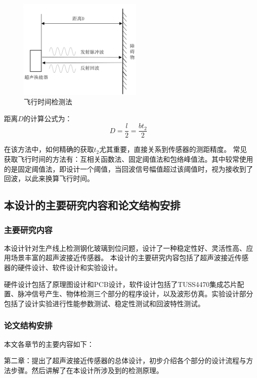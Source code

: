    \begin{figure}[!h]
    	\centering
    	\includegraphics[width=6cm]{figure/飞行时间检测法.png}
    	\caption{飞行时间检测法}
    	\label{飞行时间检测法}
    \end{figure}\par
    距离$D$的计算公式为：
    \begin{equation}
    	D=\frac{l}{2}=\frac{bt_2}{2}
    \end{equation}\par
	在该方法中，如何精确的获取$t_2$尤其重要，直接关系到传感器的测距精度。
	常见获取飞行时间的方法有：互相关函数法、固定阈值法和包络峰值法。其中较常使用的是固定阈值法，即设计一个阈值，当回波信号幅值超过该阈值时，视为接收到了回波，以此来换算飞行时间。\par
	       
\subsection{本设计的主要研究内容和论文结构安排}
\subsubsection{主要研究内容}
本设计针对生产线上检测钢化玻璃到位问题，设计了一种稳定性好、灵活性高、应用场景丰富的超声波接近传感器。
本设计的主要研究内容包括了超声波接近传感器的硬件设计、软件设计和实验设计。\par
硬件设计包括了原理图设计和PCB设计，软件设计包括了TUSS4470集成芯片配置、脉冲信号产生、物体检测三个部分的程序设计，以及波形仿真。实验设计部分包括了设计实验进行性能参数测试、稳定性测试和回波特性测试。

\subsubsection{论文结构安排}
本文各章节的主要内容如下：

第二章：提出了超声波接近传感器的总体设计，初步介绍各个部分的设计流程与方法步骤。然后讲解了在本设计所涉及到的检测原理。

